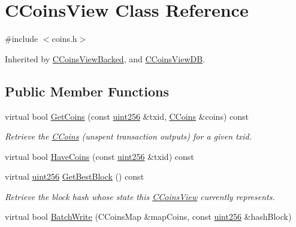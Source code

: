 \hypertarget{class_c_coins_view}{}\section{C\+Coins\+View Class Reference}
\label{class_c_coins_view}


{\ttfamily \#include $<$coins.\+h$>$}



Inherited by \mbox{\hyperlink{class_c_coins_view_backed}{C\+Coins\+View\+Backed}}, and \mbox{\hyperlink{class_c_coins_view_d_b}{C\+Coins\+View\+DB}}.

\subsection*{Public Member Functions}
\begin{DoxyCompactItemize}
\item 
\mbox{\label{class_c_coins_view_a67d865358127bef1f0011a23d5158a9f}} 
virtual bool \mbox{\hyperlink{class_c_coins_view_a67d865358127bef1f0011a23d5158a9f}{Get\+Coins}} (const \mbox{\hyperlink{classuint256}{uint256}} \&txid, \mbox{\hyperlink{class_c_coins}{C\+Coins}} \&coins) const
\begin{DoxyCompactList}\small\item\em Retrieve the \mbox{\hyperlink{class_c_coins}{C\+Coins}} (unspent transaction outputs) for a given txid. \end{DoxyCompactList}\item 
virtual bool \mbox{\hyperlink{class_c_coins_view_ade3a65fc3f1b02baf7bebce630e4eba3}{Have\+Coins}} (const \mbox{\hyperlink{classuint256}{uint256}} \&txid) const
\item 
\mbox{\label{class_c_coins_view_af81f2907d360a2548d59a61388e5e5cb}} 
virtual \mbox{\hyperlink{classuint256}{uint256}} \mbox{\hyperlink{class_c_coins_view_af81f2907d360a2548d59a61388e5e5cb}{Get\+Best\+Block}} () const
\begin{DoxyCompactList}\small\item\em Retrieve the block hash whose state this \mbox{\hyperlink{class_c_coins_view}{C\+Coins\+View}} currently represents. \end{DoxyCompactList}\item 
virtual bool \mbox{\hyperlink{class_c_coins_view_ad7dc37396ca4fac7014cea06fec7178e}{Batch\+Write}} (C\+Coins\+Map \&map\+Coins, const \mbox{\hyperlink{classuint256}{uint256}} \&hash\+Block)

\end{DoxyCompactItemize}
